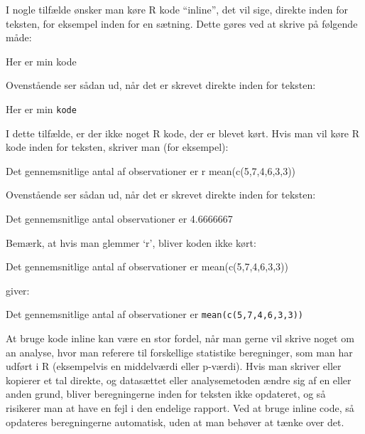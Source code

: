 \documentclass[
]{book}
\newenvironment{Shaded}{\begin{snugshade}}{\end{snugshade}}
\newcommand{\AttributeTok}[1]{\textcolor[rgb]{0.13,0.29,0.53}{#1}}
\newcommand{\NormalTok}[1]{#1}
\newcommand{\StringTok}[1]{\textcolor[rgb]{0.31,0.60,0.02}{#1}}
\begin{document}
I nogle tilfælde ønsker man køre R kode ``inline'', det vil sige, direkte inden for teksten, for eksempel inden for en sætning. Dette gøres ved at skrive på følgende måde:

\begin{Shaded}
\begin{Highlighting}[]
\NormalTok{Her er min }\StringTok{\textasciigrave{}}\AttributeTok{kode}\StringTok{\textasciigrave{}}
\end{Highlighting}
\end{Shaded}

Ovenstående ser sådan ud, når det er skrevet direkte inden for teksten:

Her er min \texttt{kode}

I dette tilfælde, er der ikke noget R kode, der er blevet kørt. Hvis man vil køre R kode inden for teksten, skriver man (for eksempel):

\begin{Shaded}
\begin{Highlighting}[]
\NormalTok{Det gennemsnitlige antal af observationer er }\StringTok{\textasciigrave{}}\AttributeTok{r mean(c(5,7,4,6,3,3))}\StringTok{\textasciigrave{}}
\end{Highlighting}
\end{Shaded}

Ovenstående ser sådan ud, når det er skrevet direkte inden for teksten:

Det gennemsnitlige antal observationer er 4.6666667

Bemærk, at hvis man glemmer `r', bliver koden ikke kørt:

\begin{Shaded}
\begin{Highlighting}[]
\NormalTok{Det gennemsnitlige antal af observationer er }\StringTok{\textasciigrave{}}\AttributeTok{mean(c(5,7,4,6,3,3))}\StringTok{\textasciigrave{}}
\end{Highlighting}
\end{Shaded}

giver:

Det gennemsnitlige antal af observationer er \texttt{mean(c(5,7,4,6,3,3))}

At bruge kode inline kan være en stor fordel, når man gerne vil skrive noget om an analyse, hvor man referere til forskellige statistike beregninger, som man har udført i R (eksempelvis en middelværdi eller p-værdi). Hvis man skriver eller kopierer et tal direkte, og datasættet eller analysemetoden ændre sig af en eller anden grund, bliver beregningerne inden for teksten ikke opdateret, og så risikerer man at have en fejl i den endelige rapport. Ved at bruge inline code, så opdateres beregningerne automatisk, uden at man behøver at tænke over det.
\end{document}
